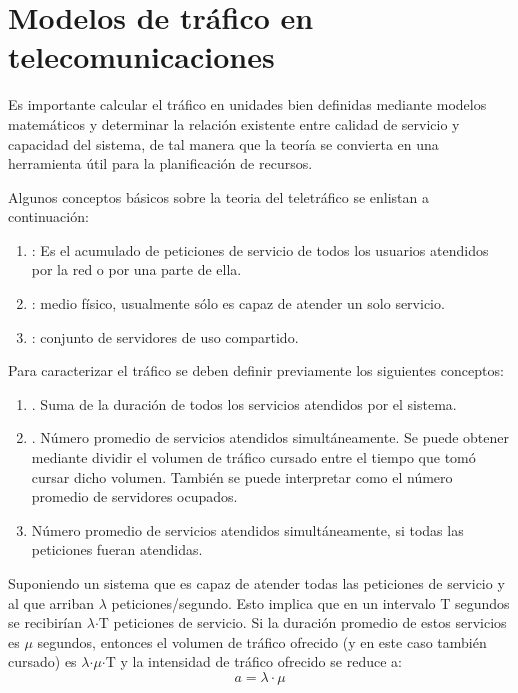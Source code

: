 
\section{Modelos de tráfico en telecomunicaciones}
Es importante calcular el tráfico en unidades bien definidas mediante modelos matemáticos y determinar la relación existente entre calidad de servicio y capacidad del sistema, de tal manera que la teoría se convierta en una herramienta útil para la planificación de recursos.\newline

Algunos conceptos básicos sobre la teoria del teletráfico se enlistan a continuación:
\begin{enumerate}
\item  {}: Es el acumulado de peticiones de servicio de todos los usuarios atendidos por la red o por una parte de ella.
\item  {}: medio físico, usualmente sólo es capaz de atender un solo servicio.
\item  {}: conjunto de servidores de uso compartido.
\end{enumerate}

Para caracterizar el tráfico se deben definir previamente los siguientes conceptos:
\begin{enumerate}
\item  {}. Suma de la duración de todos los servicios atendidos por el sistema.
\item  {}. Número promedio de servicios atendidos simultáneamente. Se puede obtener mediante dividir el volumen de tráfico cursado entre el tiempo que tomó cursar dicho volumen. También se puede interpretar como el número promedio de servidores ocupados.
\item  {} Número promedio de servicios atendidos simultáneamente, si todas las peticiones fueran atendidas.
\end{enumerate}

Suponiendo un sistema que es capaz de atender todas las peticiones de servicio y al que arriban $\lambda$ peticiones/segundo. Esto implica que en un intervalo T segundos se recibirían $\lambda$$\cdot$T peticiones de servicio. Si la duración promedio de estos servicios es $\mu$ segundos, entonces el volumen de tráfico ofrecido (y en este caso también cursado) es $\lambda$$\cdot$$\mu$$\cdot$T y la intensidad de tráfico ofrecido se reduce a:
\begin{equation}
    a=\lambda\cdot\mu
    \label{eqn:a}
\end{equation}

